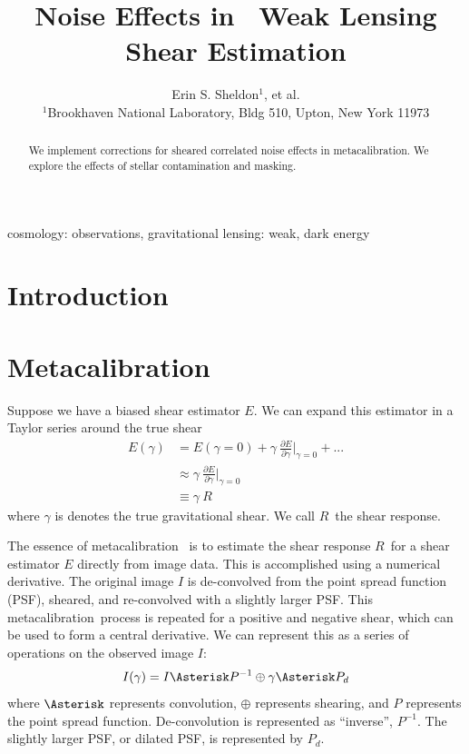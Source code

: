 \documentclass[usegraphicx,usenatbib]{mn2e}
\title{Noise Effects in \Mcal\ Weak Lensing Shear Estimation}
\author[Sheldon et al.]{Erin S. Sheldon$^1$, et al.\\
$^1$Brookhaven National Laboratory, Bldg 510, Upton, New York 11973}
\newcommand{\mcal}{metacalibration}
\newcommand{\mcalR}{$R$}
\begin{document}
\maketitle

\begin{abstract}

We implement corrections for sheared correlated noise effects in \mcal. We
explore the effects of stellar contamination and masking.   

\end{abstract}


\begin{keywords}                                                                    
    cosmology: observations,
    gravitational lensing: weak,
    dark energy
\end{keywords} 

\section{Introduction} \label{sec:intro}

\section{Metacalibration} \label{sec:algo}

Suppose we have a biased shear estimator $E$.  We can expand this estimator
in a Taylor series around the true shear
\begin{align} \label{eq:Eexpand}
    E(\gamma) &= E(\gamma=0) + \gamma ~ \frac{ \partial E }{ \partial \gamma }\bigg|_{\gamma=0}  + ... \nonumber \\
      & \approx  \gamma ~ \frac{ \partial E }{ \partial \gamma } \bigg|_{\gamma=0}  \\
      & \equiv  \gamma ~ \mbox{\mcalR} \nonumber
\end{align}
where $\gamma$ is denotes the true gravitational shear.  We call \mcalR\
the shear response.

The essence of \mcal\ \citep{HuffMcal} is to estimate the shear response
\mcalR\ for a shear estimator $E$ directly from image data.  This is
accomplished using a numerical derivative.  The original image $I$ is
de-convolved from the point spread function (PSF), sheared, and re-convolved
with a slightly larger PSF.  This \mcal\ process is repeated for a
positive and negative shear, which can be used to form a central derivative.
We can represent this as a series of operations on the observed image $I$:
\begin{equation}
    I(\gamma) = I \Asterisk P^{-1} \oplus \gamma \Asterisk P_{d}
\end{equation}
where $\Asterisk$ represents convolution, $\oplus$ represents shearing,
and $P$ represents the point spread function.  De-convolution
is represented as ``inverse'', $P^{-1}$.  The slightly larger PSF, or
dilated PSF, is represented by $P_{d}$.
\end{document}
